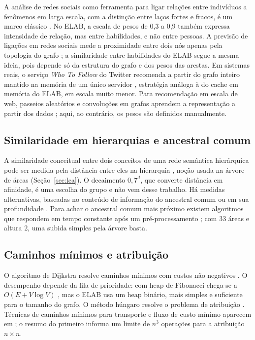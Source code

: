 \documentclass[12pt]{article}
\begin{document}
A análise de redes sociais como ferramenta para ligar relações entre indivíduos a fenômenos em larga escala, com a distinção entre laços fortes e fracos, é um marco clássico \cite{granovetter1973}. No ELAB, a escala de pesos de 0,3 a 0,9 também expressa intensidade de relação, mas entre habilidades, e não entre pessoas. A previsão de ligações em redes sociais mede a proximidade entre dois nós apenas pela topologia do grafo \cite{liben2007}; a similaridade entre habilidades do ELAB segue a mesma ideia, pois depende só da estrutura do grafo e dos pesos das arestas. Em sistemas reais, o serviço \textit{Who To Follow} do Twitter recomenda a partir do grafo inteiro mantido na memória de um único servidor \cite{gupta2013}, estratégia análoga à do cache em memória do ELAB, em escala muito menor. Para recomendação em escala de web, passeios aleatórios e convoluções em grafos aprendem a representação a partir dos dados \cite{ying2018}; aqui, ao contrário, os pesos são definidos manualmente.

\subsection{Similaridade em hierarquias e ancestral comum}

A similaridade conceitual entre dois conceitos de uma rede semântica hierárquica pode ser medida pela distância entre eles na hierarquia \cite{rada1989}, noção usada na árvore de áreas (Seção~\ref{sec:lca}). O decaimento $0{,}7^{d}$, que converte distância em afinidade, é uma escolha do grupo e não vem desse trabalho. Há medidas alternativas, baseadas no conteúdo de informação do ancestral comum \cite{resnik1995} ou em sua profundidade \cite{wu1994}. Para achar o ancestral comum mais próximo existem algoritmos que respondem em tempo constante após um pré-processamento \cite{harel1984,bender2000}; com 33 áreas e altura 2, uma subida simples pela árvore basta.

\subsection{Caminhos mínimos e atribuição}

O algoritmo de Dijkstra resolve caminhos mínimos com custos não negativos \cite{dijkstra1959}. O desempenho depende da fila de prioridade: com heap de Fibonacci chega-se a $O(E + V \log V)$ \cite{fredman1987}, mas o ELAB usa um heap binário, mais simples e suficiente para o tamanho do grafo. O método húngaro resolve o problema de atribuição \cite{kuhn1955,munkres1957}. Técnicas de caminhos mínimos para transporte e fluxo de custo mínimo aparecem em \cite{tomizawa1971,edmonds1972}; o resumo do primeiro informa um limite de $n^3$ operações para a atribuição $n \times n$.
\end{document}
